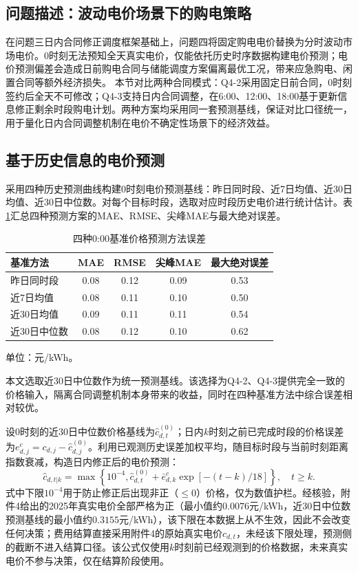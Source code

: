 \subsection{问题描述：波动电价场景下的购电策略}
在问题三日内合同修正调度框架基础上，问题四将固定购电电价替换为分时波动市场电价。0时刻无法预知全天真实电价，仅能依托历史时序数据构建电价预测；电价预测偏差会造成日前购电合同与储能调度方案偏离最优工况，带来应急购电、闲置合同等额外经济损失。
本节对比两种合同模式：Q4-2采用固定日前合同，0时刻签约后全天不可修改；Q4-3支持日内合同调整，在6:00、12:00、18:00基于更新信息修正剩余时段购电计划。两种方案均采用同一套预测基线，保证对比口径统一，用于量化日内合同调整机制在电价不确定性场景下的经济效益。

\subsection{基于历史信息的电价预测}
采用四种历史预测曲线构建0时刻电价预测基线：昨日同时段、近7日均值、近30日均值、近30日中位数。对每个目标时段，选取对应时段历史电价进行统计估计。表\ref{tab:q4_price_pred_err}汇总四种预测方案的MAE、RMSE、尖峰MAE与最大绝对误差。

\begin{table}[htbp]
\centering
\caption{四种0:00基准价格预测方法误差}
\label{tab:q4_price_pred_err}
\scriptsize
\begin{tabular}{lcccc}
\toprule
基准方法 & MAE & RMSE & 尖峰MAE & 最大绝对误差 \\
\midrule
昨日同时段 & 0.08 & 0.12 & 0.09 & 0.53 \\
近7日均值 & 0.08 & 0.11 & 0.10 & 0.50 \\
近30日均值 & 0.09 & 0.11 & 0.11 & 0.54 \\
近30日中位数 & 0.08 & 0.12 & 0.10 & 0.62 \\
\bottomrule
\end{tabular}
\par\centering\footnotesize 单位：元/kWh。
\end{table}

本文选取近30日中位数作为统一预测基线。该选择为Q4-2、Q4-3提供完全一致的价格输入，隔离合同调整机制本身带来的收益，同时在四种基准方法中综合误差相对较优。

设0时刻的近30日中位数价格基线为$\hat{c}_{d,t}^{(0)}$；日内$k$时刻之前已完成时段的价格误差为$e_{d,j}^c = c_{d,j}-\hat{c}_{d,j}^{(0)}$。利用已观测历史误差加权平均，随目标时段与当前时刻距离指数衰减，构造日内修正后的电价预测：
\begin{equation}
\hat{c}_{d,t|k} = \max\left\{10^{-4},\hat{c}_{d,t}^{(0)} + \bar{e}_{d,k}^c \exp\left[-(t-k)/18\right]\right\},\quad t \ge k.
\label{eq:q4_price_update}
\end{equation}
式中下限$10^{-4}$用于防止修正后出现非正（$\le 0$）价格，仅为数值护栏。经核验，附件4给出的2025年真实电价全部严格为正（最小值约$0.0076$元/kWh，近30日中位数预测基线的最小值约$0.3155$元/kWh），该下限在本数据上从不生效，因此不会改变任何决策；费用结算直接采用附件4的原始真实电价$c_{d,t}$，未经该下限处理，预测侧的截断不进入结算口径。该公式仅使用$k$时刻前已经观测到的价格数据，未来真实电价不参与决策，仅在结算阶段使用。

